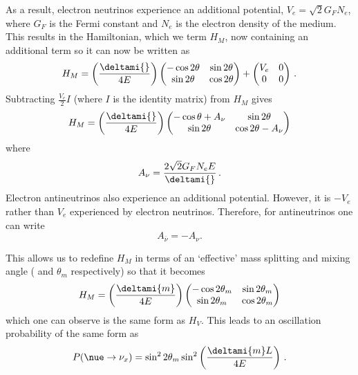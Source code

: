 As a result, electron neutrinos experience an additional potential, $V_{e} = \sqrt{2} G_{F} N_{e}$, where $G_{F}$ is the Fermi constant and $N_{e}$ is the electron density of the medium.
This results in the Hamiltonian, which we term $H_{M}$, now containing an additional term so it can now be written as
\begin{equation}
  H_{M} =  \left( \frac{\deltami{}}{4E} \right)
  \begin{pmatrix}
    -\cos 2\theta & \sin 2\theta \\
    \sin 2\theta & \cos 2\theta
  \end{pmatrix}
  +
  \begin{pmatrix}
    V_{e} & 0 \\
    0 & 0
  \end{pmatrix} \, .
\end{equation}
Subtracting $\frac{V_{e}}{2} I$ (where $I$ is the identity matrix) from $H_{M}$ gives
\begin{equation}
  H_{M} = \left( \frac{\deltami{}}{4E} \right)
  \begin{pmatrix}
    -\cos\theta + A_{\nu} & \sin 2\theta \\
    \sin 2\theta & \cos 2\theta - A_{\nu} 
  \end{pmatrix}
\end{equation}
where
\begin{equation}
  A_{\nu} = \frac{ 2\sqrt{2}G_{F}N_{e}E }{\deltami{}} \, .
\end{equation}
Electron antineutrinos also experience an additional potential. 
However, it is $-V_{e}$ rather than $V_{e}$ experienced by electron neutrinos.
Therefore, for antineutrinos one can write
\begin{equation}
	A_{\overline{\nu}} = -A_{\nu} .
\end{equation}

This allows us to redefine $H_{M}$ in terms of an `effective' mass splitting and mixing angle ( and $\theta_{m}$ respectively) so that it becomes
\begin{equation}
  H_{M} = \left( \frac{\deltami{m}}{4E} \right)
  \begin{pmatrix}
    -\cos 2\theta_{m} & \sin 2\theta_{m} \\
    \sin 2\theta_{m} & \cos 2\theta_{m}
  \end{pmatrix}
\end{equation}
which one can observe is the same form as $H_{V}$.
This leads to an oscillation probability of the same form as 
\begin{equation}
  P(\nue \rightarrow \nu_{x}) = \sin^{2} 2\theta_{m} \sin^{2} \left( \frac{\deltami{m} L}{4E} \right) \, .
\end{equation}

